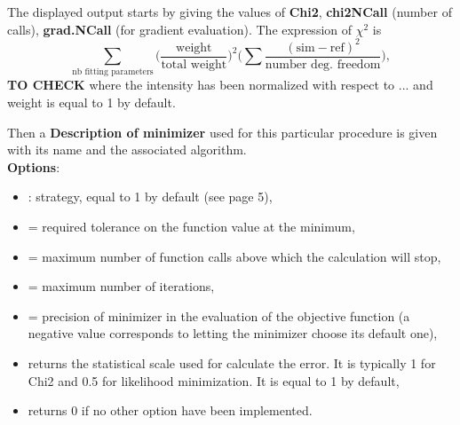 The displayed output starts by giving the values of \textbf{Chi2}, %
\textbf{chi2NCall} (number of calls), \textbf{grad.NCall} (for
gradient evaluation). The expression of $\chi^2$ is 
$$\sum_{\text{nb fitting parameters}}
\Big(\frac{\text{weight}}{\text{total weight}}\Big)^2
\Big(\sum\frac{(\text{sim}-\text{ref})^2}{\text{number
    deg. freedom}}\Big),$$
\textbf{TO CHECK}
where the intensity has been normalized with respect to ...
and weight is equal to 1 by default. 

Then a \textbf{Description of minimizer} used for
this particular procedure is given with its name and the associated
algorithm.\\

\noindent \textbf{Options}:
\begin{itemize}
\item {}:  strategy, equal to 1 by default (see
  \cite{MinuitURL} page 5),
\item {} = required tolerance on the function value at the minimum,
\item {} = maximum number of function calls above which
  the calculation will stop,
\item {} = maximum number of iterations,
\item {} = precision of minimizer in the evaluation of the
  objective function (a negative value corresponds to letting the minimizer choose its default one),
\item {} returns the statistical scale used for calculate
  the error. It is typically 1 for Chi2 and 0.5 for likelihood
  minimization. It is equal to 1 by default, 
\item {} returns 0 if no other option have been implemented.
\end{itemize}

